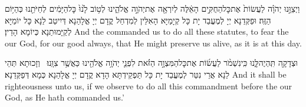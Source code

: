 {וַיְצַוֵּ֣נוּ יְהֹוָ֗ה לַעֲשׂוֹת֙ אֶת\maqqaf כׇּל\maqqaf הַחֻקִּ֣ים הָאֵ֔לֶּה לְיִרְאָ֖ה אֶת\maqqaf יְהֹוָ֣ה אֱלֹהֵ֑ינוּ לְט֥וֹב לָ֙נוּ֙ כׇּל\maqqaf הַיָּמִ֔ים לְחַיֹּתֵ֖נוּ כְּהַיּ֥וֹם הַזֶּֽה׃}
{וּפַקְּדַנָא יְיָ לְמֶעֱבַד יָת כָּל קְיָמַיָּא הָאִלֵּין לְמִדְחַל קֳדָם יְיָ אֱלָהַנָא דְּיִיטַב לַנָא כָּל יוֹמַיָּא לְקַיָּמוּתַנָא כְּיוֹמָא הָדֵין׃}
{And the \lord\space commanded us to do all these statutes, to fear the \lord\space our God, for our good always, that He might preserve us alive, as it is at this day.}{}

{וּצְדָקָ֖ה תִּֽהְיֶה\maqqaf לָּ֑נוּ כִּֽי\maqqaf נִשְׁמֹ֨ר לַעֲשׂ֜וֹת אֶת\maqqaf כׇּל\maqqaf הַמִּצְוָ֣ה הַזֹּ֗את לִפְנֵ֛י יְהֹוָ֥ה אֱלֹהֵ֖ינוּ כַּאֲשֶׁ֥ר צִוָּֽנוּ׃ \setuma }
{וְזָכוּתָא תְּהֵי לַנָא אֲרֵי נִטַּר לְמֶעֱבַד יָת כָּל תַּפְקֵידְתָּא הָדָא קֳדָם יְיָ אֱלָהַנָא כְּמָא דְּפַקְּדַנָא׃}
{And it shall be righteousness unto us, if we observe to do all this commandment before the \lord\space our God, as He hath commanded us.’}{}

